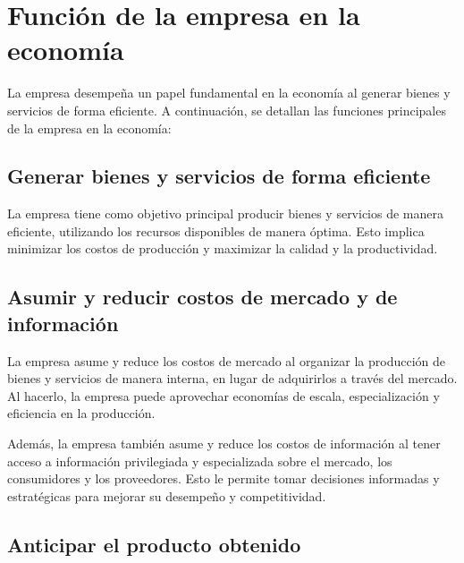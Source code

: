 \documentclass[
  letterpaper,
  DIV=11,
  numbers=noendperiod]{scrartcl}
\begin{document}
\hypertarget{funciuxf3n-de-la-empresa-en-la-economuxeda}{%
\section{Función de la empresa en la
economía}\label{funciuxf3n-de-la-empresa-en-la-economuxeda}}

La empresa desempeña un papel fundamental en la economía al generar
bienes y servicios de forma eficiente. A continuación, se detallan las
funciones principales de la empresa en la economía:

\hypertarget{generar-bienes-y-servicios-de-forma-eficiente}{%
\subsection{Generar bienes y servicios de forma
eficiente}\label{generar-bienes-y-servicios-de-forma-eficiente}}

La empresa tiene como objetivo principal producir bienes y servicios de
manera eficiente, utilizando los recursos disponibles de manera óptima.
Esto implica minimizar los costos de producción y maximizar la calidad y
la productividad.

\hypertarget{asumir-y-reducir-costos-de-mercado-y-de-informaciuxf3n}{%
\subsection{Asumir y reducir costos de mercado y de
información}\label{asumir-y-reducir-costos-de-mercado-y-de-informaciuxf3n}}

La empresa asume y reduce los costos de mercado al organizar la
producción de bienes y servicios de manera interna, en lugar de
adquirirlos a través del mercado. Al hacerlo, la empresa puede
aprovechar economías de escala, especialización y eficiencia en la
producción.

Además, la empresa también asume y reduce los costos de información al
tener acceso a información privilegiada y especializada sobre el
mercado, los consumidores y los proveedores. Esto le permite tomar
decisiones informadas y estratégicas para mejorar su desempeño y
competitividad.

\hypertarget{anticipar-el-producto-obtenido}{%
\subsection{Anticipar el producto
obtenido}\label{anticipar-el-producto-obtenido}}
\end{document}
